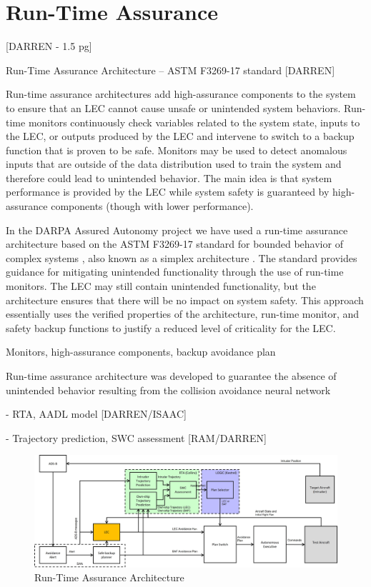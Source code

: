 \section{Run-Time Assurance}

[DARREN - 1.5 pg]

Run-Time Assurance Architecture -- ASTM F3269-17 standard [DARREN]

Run-time assurance architectures add high-assurance components
to the system to ensure that an LEC cannot cause
unsafe or unintended system behaviors. Run-time monitors
continuously check variables related to the system state, inputs
to the LEC, or outputs produced by the LEC and intervene to
switch to a backup function that is proven to be safe. Monitors
may be used to detect anomalous inputs that are outside of the
data distribution used to train the system and therefore could
lead to unintended behavior. The main idea is that system
performance is provided by the LEC while system safety is
guaranteed by high-assurance components (though with lower
performance).

In the DARPA Assured Autonomy project we have used a
run-time assurance architecture based on the ASTM F3269-17
standard for bounded behavior of complex systems \cite{F3269-17}, also
known as a simplex architecture \cite{simplex}. The standard provides
guidance for mitigating unintended functionality through the
use of run-time monitors. The LEC may still contain unintended
functionality, but the architecture ensures that there will
be no impact on system safety. This approach essentially uses
the verified properties of the architecture, run-time monitor,
and safety backup functions to justify a reduced level of
criticality for the LEC.

Monitors, high-assurance components, backup avoidance plan

Run-time assurance architecture was developed to guarantee the absence of unintended behavior resulting from the collision avoidance neural network

- RTA, AADL model [DARREN/ISAAC]

- Trajectory prediction, SWC assessment [RAM/DARREN]


\begin{figure}
	\centering
	\includegraphics[width=\textwidth]{figures/rta-arch.jpg}
	\caption{Run-Time Assurance Architecture}
	\label{fig:rta-arch}
\end{figure}

